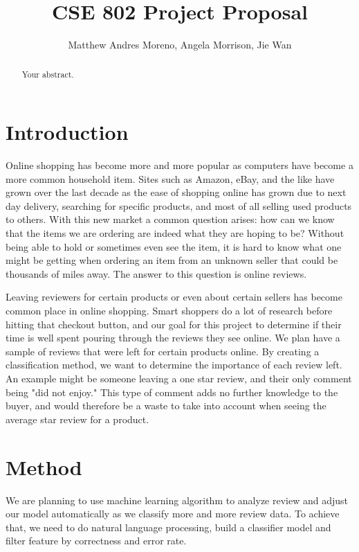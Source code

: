 \documentclass[a4paper]{article}
\date{\displaydate{date}}
\title{CSE 802 Project Proposal}
\author{Matthew Andres Moreno, Angela Morrison, Jie Wan}
\begin{document}
\maketitle

\begin{abstract}
Your abstract.
\end{abstract}

\section{Introduction}


Online shopping has become more and more popular as computers have become a more common household item. Sites such as Amazon, eBay, and the like have grown over  the last decade as the ease of shopping online has grown due to next day delivery, searching for specific products, and most of all selling used products to others. With this new market a common question arises: how can we know that the items we are ordering are indeed what they are hoping to be? Without being able to hold or sometimes even see the item, it is hard to know what one might be getting when ordering an item from an unknown seller that could be thousands of miles away. The answer to this question is online reviews.

Leaving reviewers for certain products or even about certain sellers has become common place in online shopping. Smart shoppers do a lot of research before hitting that checkout button, and our goal for this project to determine if their time is well spent pouring through the reviews they see online. We plan have a sample of reviews that were left for certain products online. By creating a classification method, we want to determine the importance of each review left. An example might be someone leaving a one star review, and their only comment being "did not enjoy." This type of comment adds no further knowledge to the buyer, and would therefore be a waste to take into account when seeing the average star review for a product.  

\section{Method}
We are planning to use machine learning algorithm to analyze review and adjust our model automatically as we classify more and more review data. To achieve that, we need to do natural language processing, build a classifier model and filter feature by correctness and error rate.
\end{document}
